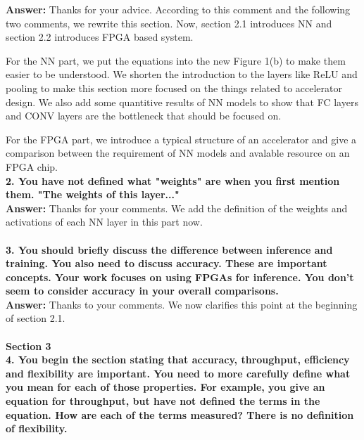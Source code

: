 \documentclass[12pt]{paper}
\newcommand{\rev}[1]{{{\color[rgb]{0,0,1}{#1}}}}
\newcommand{\answer}[1]{\noindent\textbf{Answer:} #1}
\newcommand{\comment}[1]{\noindent\textbf{#1}\\}
\begin{document}
\answer{Thanks for your advice. According to this comment and the following two comments, we rewrite this section. Now, section 2.1 introduces NN and section 2.2 introduces FPGA based system. 

For the NN part, we put the equations into the new Figure 1(b) to make them easier to be understood. We shorten the introduction to the layers like ReLU and pooling to make this section more focused on the things related to accelerator design. We also add some quantitive results of NN models to show that FC layers and CONV layers are the bottleneck that should be focused on.

For the FPGA part, we introduce a typical structure of an accelerator and give a comparison between the requirement of NN models and avalable resource on an FPGA chip. }\\

\comment{2. You have not defined what "weights" are when you first mention them.  "The weights of this layer..."}

\answer{Thanks for your comments. We add the definition of the weights and activations of each NN layer in this part now. \\

\rev{We refer the parameter of each layer as weights and the input/output of each layer as activations through this paper.}}\\

\comment{3. You should briefly discuss the difference between inference and training. You also need to discuss accuracy. These are important concepts. Your work focuses on using FPGAs for inference. You don't seem to consider accuracy in your overall comparisons.}

\answer{Thanks to your comments. We now clarifies this point at the beginning of section 2.1. \\

\rev{In this paper, we only focus on the inference of NN, which means using a trained model to predict or classify new data. The training process of NN is not discussed in this paper.}}\\

{\noindent\textbf{Section 3}}\\

\comment{4. You begin the section stating that accuracy, throughput, efficiency and flexibility are important. You need to more carefully define what you mean for each of those properties.  For example, you give an equation for throughput, but have not defined the terms in the equation.  How are each of the terms measured? There is no definition of flexibility.}
\end{document}
